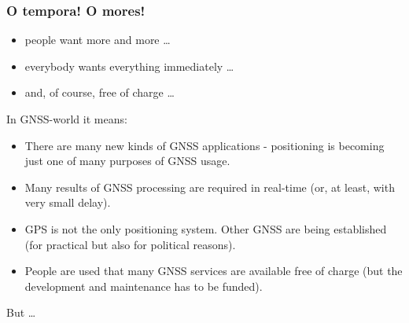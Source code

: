 \documentclass[10pt]{beamer}
\begin{document}
\begin{frame}
\frametitle{O tempora! O mores!}

\begin{itemize}
\item people want more and more \ldots
\item everybody wants everything immediately \ldots
\item \hspace*{2cm} and, of course, free of charge \ldots
\end{itemize}
\vspace*{5mm}
In GNSS-world it means:
\begin{itemize}
\item There are many new kinds of GNSS applications - positioning is becoming just one of many
  purposes of GNSS usage.
\item Many results of GNSS processing are required in real-time (or, at least, with very small
  delay).
\item GPS is not the only positioning system. Other GNSS are being established (for practical but
  also for political reasons).
\item People are used that many GNSS services are available free of charge (but the development and
  maintenance has to be funded). 
\end{itemize}

\begin{block}{But \ldots}
\end{block}

\end{frame}

\end{document}
